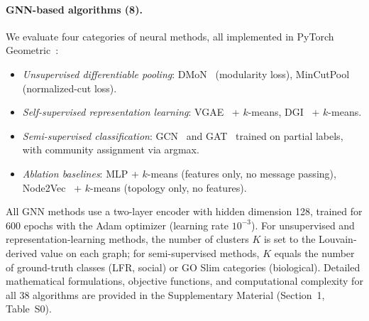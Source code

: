 \documentclass[11pt]{article}
\begin{document}
\paragraph{GNN-based algorithms (8).}
We evaluate four categories of neural methods, all implemented in PyTorch Geometric~\citep{fey_pyg_2019}:
\begin{itemize}[leftmargin=*,nosep]
  \item \emph{Unsupervised differentiable pooling}: DMoN~\citep{tsitsulin_dmon_2023} (modularity loss), MinCutPool~\citep{bianchi_mincut_2020} (normalized-cut loss).
  \item \emph{Self-supervised representation learning}: VGAE~\citep{thomas_kipf_6638cd97} + $k$-means, DGI~\citep{velickovic_dgi_2019} + $k$-means.
  \item \emph{Semi-supervised classification}: GCN~\citep{thomas_kipf_d7121869} and GAT~\citep{velickovic_gat_2018} trained on partial labels, with community assignment via argmax.
  \item \emph{Ablation baselines}: MLP + $k$-means (features only, no message passing), Node2Vec~\citep{grover_node2vec_2016} + $k$-means (topology only, no features).
\end{itemize}
All GNN methods use a two-layer encoder with hidden dimension 128, trained for 600 epochs with the Adam optimizer (learning rate $10^{-3}$).
For unsupervised and representation-learning methods, the number of clusters $K$ is set to the Louvain-derived value on each graph; for semi-supervised methods, $K$ equals the number of ground-truth classes (LFR, social) or GO Slim categories (biological).
Detailed mathematical formulations, objective functions, and computational complexity for all 38 algorithms are provided in the Supplementary Material (Section~1, Table~S0).
\end{document}
